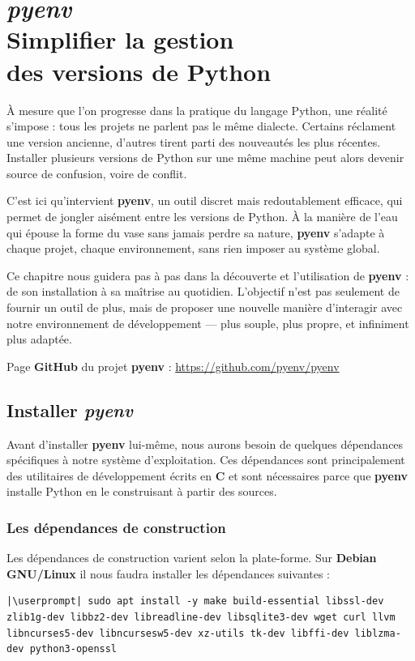\chapter[\textit{pyenv}]{\textit{pyenv} \\ Simplifier la gestion \\ des versions de Python}

\bigskip

À mesure que l’on progresse dans la pratique du langage Python, une réalité s’impose : tous les projets ne parlent pas le même dialecte. Certains réclament une version ancienne, d’autres tirent parti des nouveautés les plus récentes. Installer plusieurs versions de Python sur une même machine peut alors devenir source de confusion, voire de conflit.

C’est ici qu’intervient \textbf{pyenv}, un outil discret mais redoutablement efficace, qui permet de jongler aisément entre les versions de Python. À la manière de l’eau qui épouse la forme du vase sans jamais perdre sa nature, \textbf{pyenv} s’adapte à chaque projet, chaque environnement, sans rien imposer au système global.

Ce chapitre nous guidera pas à pas dans la découverte et l’utilisation de \textbf{pyenv} : de son installation à sa maîtrise au quotidien. L’objectif n’est pas seulement de fournir un outil de plus, mais de proposer une nouvelle manière d’interagir avec notre environnement de développement — plus souple, plus propre, et infiniment plus adaptée.

Page \textbf{GitHub} du projet \textbf{pyenv} : \url{https://github.com/pyenv/pyenv}

\section{Installer \textit{pyenv}}
Avant d'installer \textbf{pyenv} lui-même, nous aurons besoin de quelques dépendances spécifiques à notre système d'exploitation. Ces dépendances sont principalement des utilitaires de développement écrits en \textbf{C} et sont nécessaires parce que \textbf{pyenv} installe Python en le construisant à partir des sources.

\subsection*{Les dépendances de construction}
Les dépendances de construction varient selon la plate-forme. Sur \textbf{Debian GNU/Linux} il nous faudra installer les dépendances suivantes :
\begin{lstlisting}[style=bash]
|\userprompt| sudo apt install -y make build-essential libssl-dev zlib1g-dev libbz2-dev libreadline-dev libsqlite3-dev wget curl llvm libncurses5-dev libncursesw5-dev xz-utils tk-dev libffi-dev liblzma-dev python3-openssl
\end{lstlisting}

